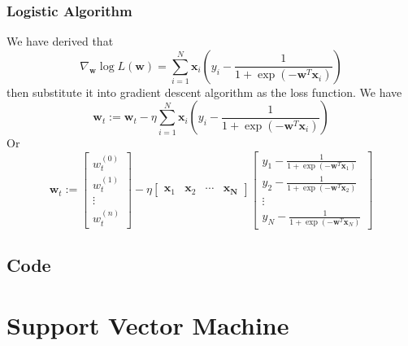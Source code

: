 \documentclass[12pt]{article}
\begin{document}
\subsubsection{Logistic Algorithm}
We have derived that
\begin{equation}
    \nabla_{\bm{w}}\log L(\bm{w}) = \sum_{i=1}^N \bm{x}_i \left(y_i - \frac{1}{1 + \exp(-\bm{w}^T\bm{x}_i)} \right)
\end{equation}
then substitute it into gradient descent algorithm as the loss function. We have
\begin{equation}
    \bm{w}_t := \bm{w}_t - \eta\sum_{i=1}^N \bm{x}_i \left(y_i - \frac{1}{1 + \exp(-\bm{w}^T\bm{x}_i)} \right)
\end{equation}
Or
\begin{equation}
    \bm{w}_t := \begin{bmatrix} w_t^{(0)} \\ w_t^{(1)} \\
    \vdots \\ w_t^{(n)} \end{bmatrix} - \eta \begin{bmatrix} \bm{x}_1 & \bm{x}_2 & \cdots & \bm{x_N}
    \end{bmatrix}
    \begin{bmatrix}
        y_1 - \frac{1}{1 + \exp(-\bm{w}^T\bm{x}_1)} \\
        y_2 - \frac{1}{1 + \exp(-\bm{w}^T\bm{x}_2)}  \\
        \vdots \\ y_N - \frac{1}{1 + \exp(-\bm{w}^T\bm{x}_N)}
    \end{bmatrix}
\end{equation}
\subsection{Code}

\section{Support Vector Machine}
\end{document}
